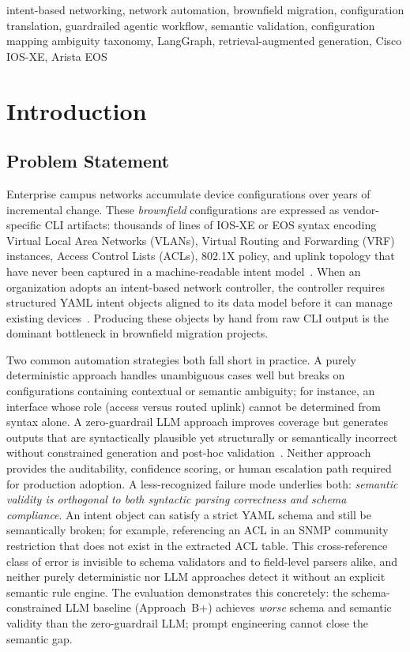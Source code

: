 \documentclass[conference]{IEEEtran}
\begin{document}
\begin{IEEEkeywords}
intent-based networking, network automation, brownfield migration, configuration translation, guardrailed agentic workflow, semantic validation, configuration mapping ambiguity taxonomy, LangGraph, retrieval-augmented generation, Cisco IOS-XE, Arista EOS
\end{IEEEkeywords}

\section{Introduction}

\subsection{Problem Statement}

Enterprise campus networks accumulate device configurations over years of incremental change. These \emph{brownfield} configurations are expressed as vendor-specific CLI artifacts: thousands of lines of IOS-XE or EOS syntax encoding Virtual Local Area Networks (VLANs), Virtual Routing and Forwarding (VRF) instances, Access Control Lists (ACLs), 802.1X policy, and uplink topology that have never been captured in a machine-readable intent model~\cite{martinez2015cli}. When an organization adopts an intent-based network controller, the controller requires structured YAML intent objects aligned to its data model before it can manage existing devices~\cite{leivadeas2023survey,juniper2023apstra}. Producing these objects by hand from raw CLI output is the dominant bottleneck in brownfield migration projects.

Two common automation strategies both fall short in practice. A purely deterministic approach handles unambiguous cases well but breaks on configurations containing contextual or semantic ambiguity; for instance, an interface whose role (access versus routed uplink) cannot be determined from syntax alone. A zero-guardrail LLM approach improves coverage but generates outputs that are syntactically plausible yet structurally or semantically incorrect without constrained generation and post-hoc validation~\cite{wu2024netllm,dzeparoska2023policy,ji2023survey}. Neither approach provides the auditability, confidence scoring, or human escalation path required for production adoption. A less-recognized failure mode underlies both: \emph{semantic validity is orthogonal to both syntactic parsing correctness and schema compliance}. An intent object can satisfy a strict YAML schema and still be semantically broken; for example, referencing an ACL in an SNMP community restriction that does not exist in the extracted ACL table. This cross-reference class of error is invisible to schema validators and to field-level parsers alike, and neither purely deterministic nor LLM approaches detect it without an explicit semantic rule engine. The evaluation demonstrates this concretely: the schema-constrained LLM baseline (Approach~B+) achieves \emph{worse} schema and semantic validity than the zero-guardrail LLM; prompt engineering cannot close the semantic gap.
\end{document}
